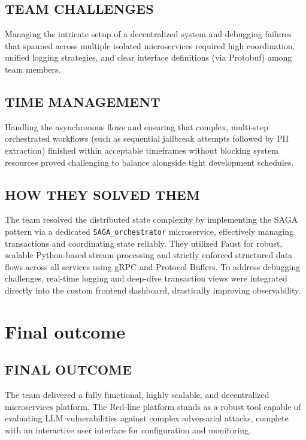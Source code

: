 \documentclass[12pt,a4paper]{article}
\begin{document}
\subsection*{TEAM CHALLENGES}
Managing the intricate setup of a decentralized system and debugging failures that spanned across multiple isolated microservices required high coordination, unified logging strategies, and clear interface definitions (via Protobuf) among team members. 

\subsection*{TIME MANAGEMENT}
Handling the asynchronous flows and ensuring that complex, multi-step orchestrated workflows (such as sequential jailbreak attempts followed by PII extraction) finished within acceptable timeframes without blocking system resources proved challenging to balance alongside tight development schedules.

\subsection*{HOW THEY SOLVED THEM}
The team resolved the distributed state complexity by implementing the SAGA pattern via a dedicated \texttt{SAGA\_orchestrator} microservice, effectively managing transactions and coordinating state reliably. They utilized Faust for robust, scalable Python-based stream processing and strictly enforced structured data flows across all services using gRPC and Protocol Buffers. To address debugging challenges, real-time logging and deep-dive transaction views were integrated directly into the custom frontend dashboard, drastically improving observability.

\section*{Final outcome}

\subsection*{FINAL OUTCOME}
The team delivered a fully functional, highly scalable, and decentralized microservices platform. The Red-line platform stands as a robust tool capable of evaluating LLM vulnerabilities against complex adversarial attacks, complete with an interactive user interface for configuration and monitoring.
\end{document}
